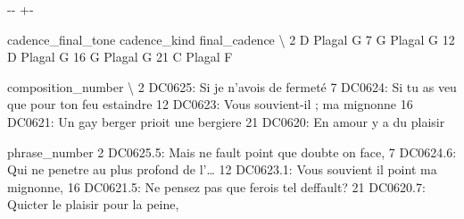 \documentclass[letterpaper,10pt,english]{sphinxmanual}
\newlength\nbsphinxcodecellspacing
\begin{document}
{

\kern-\sphinxverbatimsmallskipamount\kern-\baselineskip
\kern+\FrameHeightAdjust\kern-\fboxrule
\vspace{\nbsphinxcodecellspacing}

\begin{sphinxVerbatim}[commandchars=\\\{\}]
\llap{\color{nbsphinxout}[33]:\,\hspace{\fboxrule}\hspace{\fboxsep}}   cadence\_final\_tone cadence\_kind final\_cadence  \textbackslash{}
2                   D       Plagal             G
7                   G       Plagal             G
12                  D       Plagal             G
16                  G       Plagal             G
21                  C       Plagal             F

                                 composition\_number  \textbackslash{}
2                  DC0625: Si je n'avois de fermeté
7   DC0624: Si tu as veu que pour ton feu estaindre
12           DC0623: Vous souvient-il ; ma mignonne
16        DC0621: Un gay berger prioit une bergiere
21                  DC0620: En amour y a du plaisir

                                        phrase\_number
2   DC0625.5: Mais ne fault point que doubte on face,
7   DC0624.6: Qui ne penetre au plus profond de l'{\ldots}
12      DC0623.1: Vous souvient il point ma mignonne,
16   DC0621.5: Ne pensez pas que ferois tel deffault?
21        DC0620.7: Quicter le plaisir pour la peine,
\end{sphinxVerbatim}
}
\end{document}
